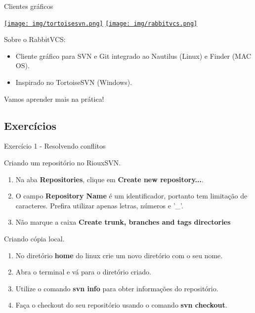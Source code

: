 \documentclass[a4paper]{beamer}
\begin{document}
\begin{frame}{Clientes gráficos}

\begin{center}
\href{https://tortoisesvn.net/}{\texttt{[image: img/tortoisesvn.png]}}
\hspace{20pt}
\href{http://rabbitvcs.org/}{\texttt{[image: img/rabbitvcs.png]}}
\end{center}
\pause

\vspace{10pt}
Sobre o RabbitVCS:
\begin{itemize}
\item Cliente gráfico para SVN e Git integrado ao Nautilus (Linux) e Finder (MAC OS).
\item Inspirado no TortoiseSVN (Windows).
\end{itemize}
\pause

\vspace{10pt}
Vamos aprender mais na prática!

\end{frame}

\subsection{Exercícios}

\begin{frame}{Exercício 1 - Resolvendo conflitos}

Criando um repositório no RiouxSVN.
\begin{enumerate}
\item Na aba \textbf{Repositories}, clique em \textbf{Create new repository...}.
\item O campo \textbf{Repository Name} é um identificador, portanto tem limitação de caracteres. Prefira utilizar apenas letras, números e '\_'.
\item Não marque a caixa \textbf{Create trunk, branches and tags directories}
\end{enumerate}

\pause
\vspace{10pt}
Criando cópia local.
\begin{enumerate}
\item No diretório \textbf{home} do linux crie um novo diretório com o seu nome.
\item Abra o terminal e vá para o diretório criado.
\item Utilize o comando \textbf{svn info} para obter informações do repositório.
\item Faça o checkout do seu repositório usando o comando \textbf{svn checkout}.
\end{enumerate}

\end{frame}
\end{document}
